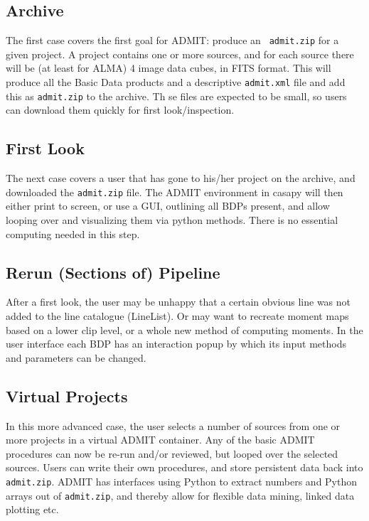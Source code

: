 \documentclass{article}
\begin{document}
\subsection{Archive}

The first case covers the first goal for ADMIT: produce an {\tt
  admit.zip} for a given project.  A project contains one or more
sources, and for each source there will be (at least for ALMA) 4 image
data cubes, in FITS format. This will produce all the Basic Data
products and a descriptive {\tt admit.xml} file and add this as 
{\tt admit.zip} to the archive. Th
se files are expected to be small, so users can download them
quickly for first look/inspection.


\subsection{First Look}

The next case covers a user that has gone to his/her project on the archive,
and downloaded the {\tt admit.zip} file. The ADMIT environment in casapy
will then either print to screen, or use a GUI, outlining all BDPs present, and
allow looping over and visualizing them via python methods. There is no
essential computing needed in this step.

\subsection{Rerun (Sections of) Pipeline}

After a first look, the user may be unhappy that a certain obvious line
was not added to the line catalogue (LineList). Or may want to recreate
moment maps based on a lower clip level, or a whole new method of
computing moments. In the user interface each BDP has an
interaction popup by which its input methods and parameters can be changed.

\subsection{Virtual Projects}

In this more advanced case, the user selects a number of sources from one
or more projects in a virtual ADMIT container. Any of the basic ADMIT procedures
can now be re-run and/or reviewed, but looped over the selected sources.
Users can write their own procedures,
and store persistent data back into {\tt admit.zip}. ADMIT has interfaces
using Python to extract numbers and Python arrays out of {\tt admit.zip}, and thereby
allow for flexible data mining, linked data plotting etc.
\end{document}
